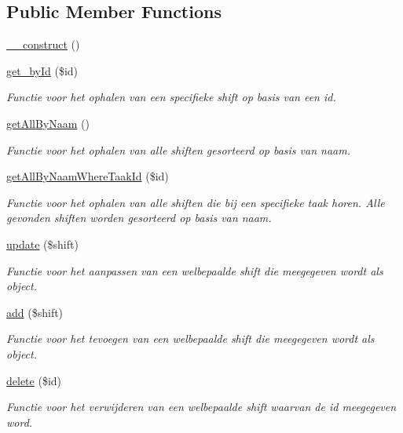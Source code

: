 \subsection*{Public Member Functions}
\begin{DoxyCompactItemize}
\item 
\mbox{\hyperlink{class_shiften___model_a095c5d389db211932136b53f25f39685}{\+\_\+\+\_\+construct}} ()
\item 
\mbox{\hyperlink{class_shiften___model_a98d28a4d9a29d40c5a8aa0176f19a919}{get\+\_\+by\+Id}} (\$id)
\begin{DoxyCompactList}\small\item\em Functie voor het ophalen van een specifieke shift op basis van een id. \end{DoxyCompactList}\item 
\mbox{\hyperlink{class_shiften___model_a2b035b1ffd1cbe651b35bb3e53d72c09}{get\+All\+By\+Naam}} ()
\begin{DoxyCompactList}\small\item\em Functie voor het ophalen van alle shiften gesorteerd op basis van naam. \end{DoxyCompactList}\item 
\mbox{\hyperlink{class_shiften___model_a537c83774b71a66979239cdffbb584d4}{get\+All\+By\+Naam\+Where\+Taak\+Id}} (\$id)
\begin{DoxyCompactList}\small\item\em Functie voor het ophalen van alle shiften die bij een specifieke taak horen. Alle gevonden shiften worden gesorteerd op basis van naam. \end{DoxyCompactList}\item 
\mbox{\hyperlink{class_shiften___model_a0275d30c0139203609e59da92dc43790}{update}} (\$shift)
\begin{DoxyCompactList}\small\item\em Functie voor het aanpassen van een welbepaalde shift die meegegeven wordt als object. \end{DoxyCompactList}\item 
\mbox{\hyperlink{class_shiften___model_a3fc76f85c3f3f387825bd98a099eb973}{add}} (\$shift)
\begin{DoxyCompactList}\small\item\em Functie voor het tevoegen van een welbepaalde shift die meegegeven wordt als object. \end{DoxyCompactList}\item 
\mbox{\hyperlink{class_shiften___model_a2f8258add505482d7f00ea26493a5723}{delete}} (\$id)
\begin{DoxyCompactList}\small\item\em Functie voor het verwijderen van een welbepaalde shift waarvan de id meegegeven word. \end{DoxyCompactList}\end{DoxyCompactItemize}


